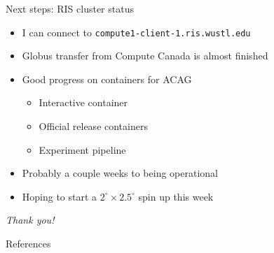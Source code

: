 \documentclass[10pt]{beamer}
\begin{document}
\begin{frame}{Next steps: RIS cluster status}
    \begin{itemize}
        \item I can connect to \texttt{compute1-client-1.ris.wustl.edu}
        \vspace{0.4cm}
        \item Globus transfer from Compute Canada is almost finished
        \vspace{0.4cm}
        \item Good progress on containers for ACAG
        \begin{itemize}
            \footnotesize
            \vspace{0.1cm}
            \item Interactive container
            \vspace{0.1cm}
            \item Official release containers
            \vspace{0.1cm}
            \item Experiment pipeline
        \end{itemize}
        \vspace{0.4cm}
        \item Probably a couple weeks to being operational
        \vspace{0.4cm}
        \item Hoping to start a $2^\circ \times 2.5^\circ$ spin up this week
    \end{itemize}
\end{frame}

\begin{frame}{}
  \centering \Large
  \emph{Thank you!}
\end{frame}

\begin{frame}[allowframebreaks]{References}
    \nocite{geos-chem_developers_narrative_2019}
    \nocite{geos-chem_developers_boundary_2019}
    \tiny
  
  

\end{frame}
\end{document}
